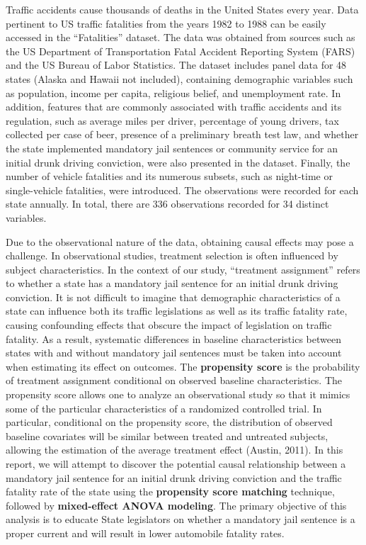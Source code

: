 \documentclass[]{article}
\begin{document}
Traffic accidents cause thousands of deaths in the United States every
year. Data pertinent to US traffic fatalities from the years 1982 to
1988 can be easily accessed in the ``Fatalities'' dataset. The data was
obtained from sources such as the US Department of Transportation Fatal
Accident Reporting System (FARS) and the US Bureau of Labor Statistics.
The dataset includes panel data for 48 states (Alaska and Hawaii not
included), containing demographic variables such as population, income
per capita, religious belief, and unemployment rate. In addition,
features that are commonly associated with traffic accidents and its
regulation, such as average miles per driver, percentage of young
drivers, tax collected per case of beer, presence of a preliminary
breath test law, and whether the state implemented mandatory jail
sentences or community service for an initial drunk driving conviction,
were also presented in the dataset. Finally, the number of vehicle
fatalities and its numerous subsets, such as night-time or
single-vehicle fatalities, were introduced. The observations were
recorded for each state annually. In total, there are 336 observations
recorded for 34 distinct variables.

Due to the observational nature of the data, obtaining causal effects
may pose a challenge. In observational studies, treatment selection is
often influenced by subject characteristics. In the context of our
study, ``treatment assignment'' refers to whether a state has a
mandatory jail sentence for an initial drunk driving conviction. It is
not difficult to imagine that demographic characteristics of a state can
influence both its traffic legislations as well as its traffic fatality
rate, causing confounding effects that obscure the impact of legislation
on traffic fatality. As a result, systematic differences in baseline
characteristics between states with and without mandatory jail sentences
must be taken into account when estimating its effect on outcomes. The
\textbf{propensity score} is the probability of treatment assignment
conditional on observed baseline characteristics. The propensity score
allows one to analyze an observational study so that it mimics some of
the particular characteristics of a randomized controlled trial. In
particular, conditional on the propensity score, the distribution of
observed baseline covariates will be similar between treated and
untreated subjects, allowing the estimation of the average treatment
effect (Austin, 2011). In this report, we will attempt to discover the
potential causal relationship between a mandatory jail sentence for an
initial drunk driving conviction and the traffic fatality rate of the
state using the \textbf{propensity score matching} technique, followed
by \textbf{mixed-effect ANOVA modeling}. The primary objective of this
analysis is to educate State legislators on whether a mandatory jail
sentence is a proper current and will result in lower automobile
fatality rates.
\end{document}
